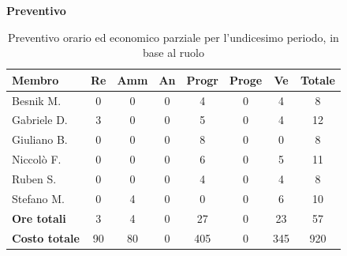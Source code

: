 \documentclass[a4paper,10pt]{article}
\begin{document}
\textbf{Preventivo} \\
\begin{table}[H]
\centering
\begin{tabular}{|l|c|c|c|c|c|c|c|}
\hline
\textbf{Membro} & \textbf{Re} & \textbf{Amm} & \textbf{An} & \textbf{Progr} & \textbf{Proge} & \textbf{Ve} & \textbf{Totale} \\
\hline
Besnik M.   & 0   & 0   & 0 & 4   & 0 & 4 & 8 \\
Gabriele D. & 3   & 0   & 0 & 5   & 0 & 4  & 12 \\
Giuliano B. & 0   & 0   & 0 & 8   & 0 & 0  & 8 \\
Niccolò F.  & 0   & 0   & 0 & 6   & 0 & 5  & 11 \\
Ruben S.    & 0   & 0   & 0 & 4   & 0 & 4  & 8 \\
Stefano M.  & 0   & 4   & 0 & 0   & 0 & 6  & 10 \\
\hline
\textbf{Ore totali} & 3  & 4 & 0 & 27  & 0  & 23 & 57 \\
\hline
\textbf{Costo totale} & 90 & 80 & 0 & 405  & 0  & 345 & 920 \\
\hline
\end{tabular}
\caption{Preventivo orario ed economico parziale per l'undicesimo periodo, in base al ruolo}
\end{table}
\end{document}
